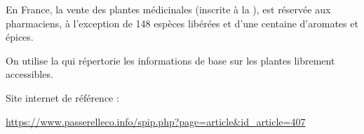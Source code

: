 En France, la vente des plantes médicinales (inscrite à la ), est réservée aux pharmaciens, à l’exception de 148 espèces libérées et d’une centaine d’aromates et épices.

On utilise la  qui répertorie les informations de base sur les plantes librement accessibles. 

Site internet de référence : \\
\begin{center}\href{https://www.passerelleco.info/spip.php?page=article\&id_article=407}{https://www.passerelleco.info/spip.php?page=article\&id\_article=407}\end{center}